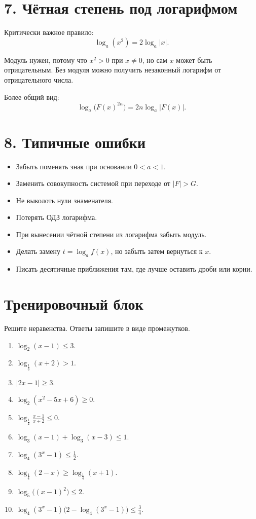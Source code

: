 \documentclass[a4paper,12pt]{article}
\begin{document}
\section*{7. Чётная степень под логарифмом}

Критически важное правило:
\[
\log_a(x^2)=2\log_a|x|.
\]

Модуль нужен, потому что \(x^2>0\) при \(x\ne0\), но сам \(x\) может быть отрицательным. Без модуля можно получить незаконный логарифм от отрицательного числа.

Более общий вид:
\[
\log_a\bigl(F(x)^{2n}\bigr)=2n\log_a|F(x)|.
\]

\section*{8. Типичные ошибки}

\begin{itemize}
\item Забыть поменять знак при основании \(0<a<1\).
\item Заменить совокупность системой при переходе от \(|F|>G\).
\item Не выколоть нули знаменателя.
\item Потерять ОДЗ логарифма.
\item При вынесении чётной степени из логарифма забыть модуль.
\item Делать замену \(t=\log_a f(x)\), но забыть затем вернуться к \(x\).
\item Писать десятичные приближения там, где лучше оставить дроби или корни.
\end{itemize}

\newpage

\section*{Тренировочный блок}

Решите неравенства. Ответы запишите в виде промежутков.

\begin{enumerate}
\item \(\log_2(x-1)\le3\).
\item \(\log_{\frac13}(x+2)>1\).
\item \(|2x-1|\ge3\).
\item \(\log_2(x^2-5x+6)\ge0\).
\item \(\log_{\frac12}\frac{x-1}{x+2}\le0\).
\item \(\log_3(x-1)+\log_3(x-3)\le1\).
\item \(\log_4(3^x-1)\le\frac12\).
\item \(\log_{\frac14}(2-x)\ge \log_{\frac14}(x+1)\).
\item \(\log_5\bigl((x-1)^2\bigr)\le2\).
\item \(\log_4(3^x-1)\bigl(2-\log_4(3^x-1)\bigr)\le\frac34\).
\end{enumerate}
\end{document}
